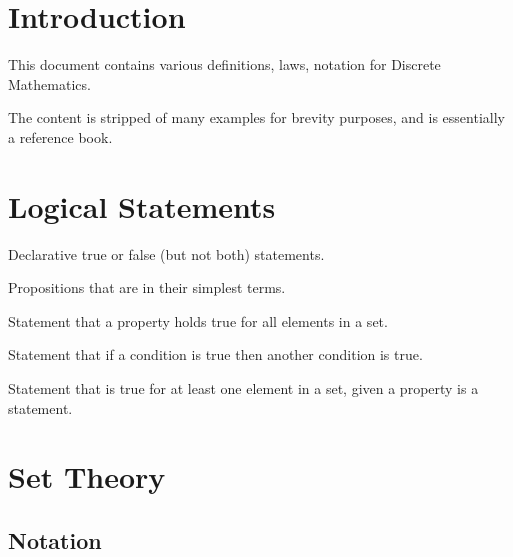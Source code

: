 \documentclass[11pt]{article}
\begin{document}



\tableofcontents

\section{Introduction}


This document contains various definitions, laws, notation for Discrete Mathematics.

The content is stripped of many examples for brevity purposes, and is essentially a reference book.

\section{Logical Statements}

\begin{definition}[Propositions]\label{def:props}
Declarative true or false (but not both) statements.
\end{definition}

\begin{definition}\label{def:prims}
Propositions that are in their simplest terms.
\end{definition}

\begin{definition}\label{def:universal-stmts}
Statement that a property holds true for all elements in a set.
\end{definition}

\begin{definition}\label{def:cond-stmts}
Statement that if a condition is true then another condition is true.
\end{definition}

\begin{definition}\label{def:exist-stmts}
Statement that is true for at least one element in a set, given a property is a statement.
\end{definition}

\section{Set Theory}

\subsection{Notation}
\end{document}
